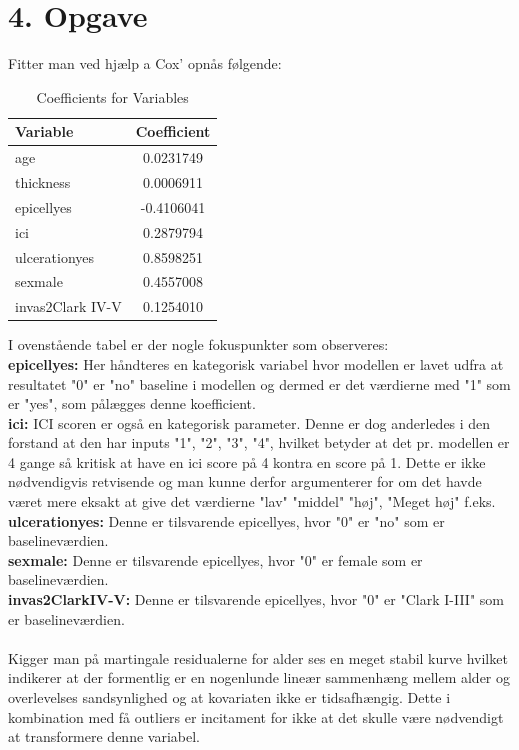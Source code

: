 \chapter{4. Opgave}
Fitter man ved hjælp a Cox' opnås følgende:
\begin{table}[H]
\centering
\begin{tabular}{|l|c|}
\hline
\textbf{Variable} & \textbf{Coefficient} \\
\hline
age & 0.0231749 \\
thickness & 0.0006911 \\
epicellyes & -0.4106041 \\
ici & 0.2879794 \\
ulcerationyes & 0.8598251 \\
sexmale & 0.4557008 \\
invas2Clark IV-V & 0.1254010 \\
\hline
\end{tabular}
\caption{Coefficients for Variables}
\label{tab:coefficients}
\end{table}
I ovenstående tabel er der nogle fokuspunkter som observeres:\\
\textbf{epicellyes:} Her håndteres en kategorisk variabel hvor modellen er lavet udfra at resultatet "0" er "no" baseline i modellen og dermed er det værdierne med "1" som er "yes", som pålægges denne koefficient.\\
\textbf{ici:} ICI scoren er også en kategorisk parameter. Denne er dog anderledes i den forstand at den har inputs "1", "2", "3", "4", hvilket betyder at det pr. modellen er 4 gange så kritisk at have en ici score på 4 kontra en score på 1. Dette er ikke nødvendigvis retvisende og man kunne derfor argumenterer for om det havde været mere eksakt at give det værdierne "lav" "middel" "høj", "Meget høj" f.eks.\\
\textbf{ulcerationyes:} Denne er tilsvarende epicellyes, hvor "0" er "no" som er baselineværdien.\\
\textbf{sexmale:} Denne er tilsvarende epicellyes, hvor "0" er female som er baselineværdien.\\
\textbf{invas2ClarkIV-V:} Denne er tilsvarende epicellyes, hvor "0" er "Clark I-III" som er baselineværdien.\\\\
Kigger man på martingale residualerne for alder ses en meget stabil kurve hvilket indikerer at der formentlig er en nogenlunde lineær sammenhæng mellem alder og overlevelses sandsynlighed og at kovariaten ikke er tidsafhængig. Dette i kombination med få outliers er incitament for ikke at det skulle være nødvendigt at transformere denne variabel.\\
